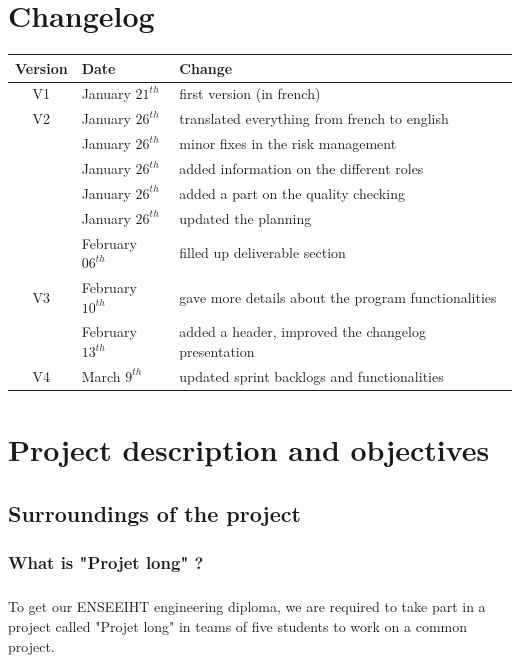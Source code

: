 \documentclass{report}
\begin{document}
\chapter*{Changelog}
\begin{center}
\begin{tabular}{|c|l|l|}
  \hline
  Version & Date & Change  \\
  \hline
  V1 & January $21^{th}$ & first version (in french) \\
  \hline
  V2 & January $26^{th}$  & translated everything from french to english \\
   & January $26^{th}$  & minor fixes in the risk management \\
   & January $26^{th}$  & added information on the different roles \\
   & January $26^{th}$  & added a part on the quality checking \\
   & January $26^{th}$  & updated the planning \\
   & February $06^{th}$ & filled up deliverable section \\
  \hline
  V3 & February $10^{th}$ & gave more details about the program functionalities \\
  & February $13^{th}$ & added a header, improved the changelog presentation \\
  \hline
  V4 & March $9^{th}$ & updated sprint backlogs and functionalities \\
  \hline
\end{tabular}
\end{center}
\chapter{Project description and objectives}

\section{Surroundings of the project}

\subsection{What is "Projet long" ?}

\paragraph{}
\hspace{4mm}To get our ENSEEIHT engineering diploma, we are required to take part in 
a project called "Projet long" in teams of five students to work 
on a common project.
\end{document}
